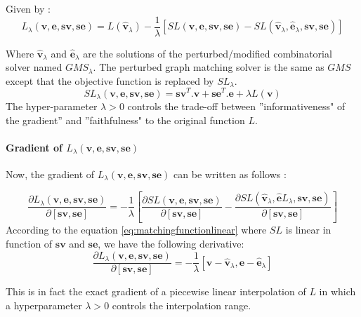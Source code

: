 \documentclass[times,onecolumn,final,authoryear]{article}
\theoremstyle{definition}
\begin{document}
Given by \cite{DBLP:journals/corr/abs-1912-02175} :
\begin{equation}
L_{\lambda}(\textbf{v},\textbf{e},\textbf{sv},\textbf{se}) =  L(\mathbf{\hat{v}}_\lambda)- \frac{1}{\lambda} [SL(\textbf{v},\textbf{e},\textbf{sv},\textbf{se}) - SL(\hat{\textbf{v}}_\lambda,\hat{\textbf{e}}_\lambda,\textbf{sv},\textbf{se}) ]
\end{equation}


Where $\hat{\textbf{v}}_\lambda$ and $\hat{\textbf{e}}_\lambda$ are the solutions of the perturbed/modified combinatorial solver named $GMS_\lambda$. The perturbed graph matching solver is the same as $GMS$ except that the objective function is replaced by $SL_\lambda$.
$$ SL_\lambda(\textbf{v},\textbf{e},\mathbf{sv},\mathbf{se}) = \mathbf{sv}^{T}.\mathbf{v} +  \mathbf{se}^{T}.\mathbf{e} + \lambda L(\mathbf{v})$$
The hyper-parameter $\lambda >0$  controls the trade-off between ''informativeness" of the gradient” and ''faithfulness" to the original function $L$.


\paragraph{Gradient of $L_{\lambda}(\textbf{v}, \textbf{e},\mathbf{sv},\mathbf{se})$}
Now, the gradient of $L_{\lambda}(\textbf{v}, \textbf{e},\mathbf{sv},\mathbf{se})$ can be written as follows : 


\begin{equation}
\frac{\partial L_\lambda(\textbf{v}, \textbf{e},\mathbf{sv},\mathbf{se})} {\partial [\mathbf{sv},\mathbf{se}]}= - \frac{1}{\lambda} [\frac{\partial SL(\textbf{v}, \textbf{e},\mathbf{sv},\mathbf{se})}{\partial [ \mathbf{sv},\mathbf{se}]}  -  \frac{\partial SL(\hat{\textbf{v}}_\lambda, \hat{\textbf{e}}L_\lambda,\mathbf{sv},\mathbf{se}) }{\partial [ \mathbf{sv},\mathbf{se} ]}  ]
\end{equation}
According to the equation \eqref{eq:matchingfunctionlinear} where $SL$ is linear in function of $\mathbf{sv}$ and $\mathbf{se}$, we have the following derivative:
\begin{equation}
\frac{\partial L_\lambda(\textbf{v}, \textbf{e},\mathbf{sv},\mathbf{se})} {\partial [ \mathbf{sv},\mathbf{se} ]}= - \frac{1}{\lambda} [\textbf{v}-\hat{\textbf{v}}_\lambda, \textbf{e}-\hat{\textbf{e}}_\lambda ]
\end{equation}


This is in fact the exact gradient of a piecewise linear interpolation of $L$ in which a hyperparameter $\lambda > 0$ controls the interpolation range.
\end{document}
